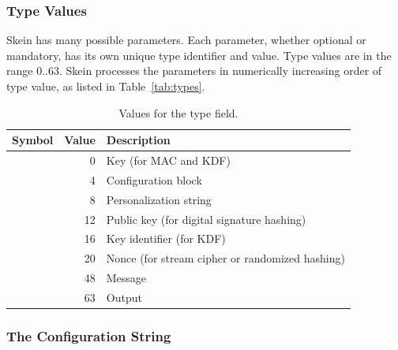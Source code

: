 \documentclass[11pt,twoside]{article}
\def\symdef#1{\label{symdef:#1}}
\newcommand{\TypeSymbol}[1]{\text{$T_\text{#1}$}\xspace}
\newcommand{\TypeKey}{\TypeSymbol{key}}
\newcommand{\TypeConfig}{\TypeSymbol{cfg}}
\newcommand{\TypePers}{\TypeSymbol{prs}}
\newcommand{\TypePK}{\TypeSymbol{PK}}
\newcommand{\TypeKDF}{\TypeSymbol{kdf}}
\newcommand{\TypeNonce}{\TypeSymbol{non}}
\newcommand{\TypeMsg}{\TypeSymbol{msg}}
\newcommand{\TypeOut}{\TypeSymbol{out}}
\begin{document}
\subsubsection{Type Values}

Skein has many possible parameters. Each parameter, whether optional or mandatory, has its own unique type identifier and value. Type values are in the range 0..63. Skein processes the parameters in numerically increasing order of type value, as listed in Table~\ref{tab:types}.
%
\begin{table}[tbh]
\begin{center}
\begin{tabular}{|rrl|}
\hline
  Symbol & Value & Description \\
\hline
  \TypeKey & 0 & Key (for MAC and KDF)\\
  \TypeConfig & 4 & Configuration block \\
  \TypePers & 8 & Personalization string \\
  \TypePK & 12 & Public key (for digital signature hashing)\\
  \TypeKDF & 16 & Key identifier (for KDF)\\
  \TypeNonce & 20 & Nonce (for stream cipher or randomized hashing)\\
  \TypeMsg & 48 & Message \\
  \TypeOut & 63 & Output\\
\hline
\end{tabular}
\caption{Values for the type field.}\label{tab:types}\symdef{T_xxx}
\end{center}
\end{table}
%

\subsubsection{The Configuration String}\label{sec:configString}
\end{document}
